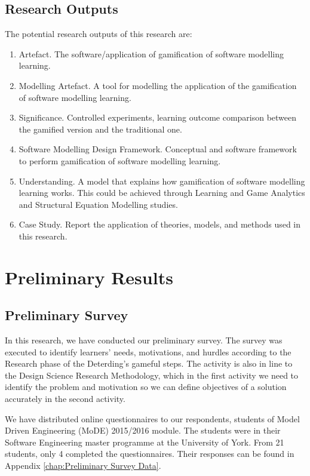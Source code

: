 \documentclass[12pt, a4paper]{report}
\begin{document}
\section{Research Outputs}
The potential research outputs of this research are:
\begin{enumerate}
\item Artefact. The software/application of gamification of software modelling learning.
\item Modelling Artefact. A tool for modelling the application of the gamification of software modelling learning.
\item Significance. Controlled experiments, learning outcome comparison between the gamified version and the traditional one.
\item Software Modelling Design Framework. Conceptual and software framework to perform gamification of software modelling learning.
\item Understanding. A model that explains how gamification of software modelling learning works.
This could be achieved through Learning and Game Analytics and Structural Equation Modelling studies.
\item Case Study. Report the application of theories, models, and methods used in this research.
\end{enumerate}

\chapter{Preliminary Results}

\section{Preliminary Survey}
\label{Preliminary Survey}
In this research, we have conducted our preliminary survey. The survey was executed to identify learners' needs, motivations, and hurdles according to the Research phase of the Deterding's gameful steps. The activity is also in line to the Design Science Research Methodology, which in the first activity we need to identify the problem and motivation so we can define objectives of a solution accurately in the second activity. 

We have distributed online questionnaires to our respondents, students of Model Driven Engineering (MoDE) 2015/2016 module. The students were in their Software Engineering master programme at the University of York. From 21 students, only 4 completed the questionnaires. Their responses can be found in Appendix \autoref{chap:Preliminary Survey Data}.
\end{document}

